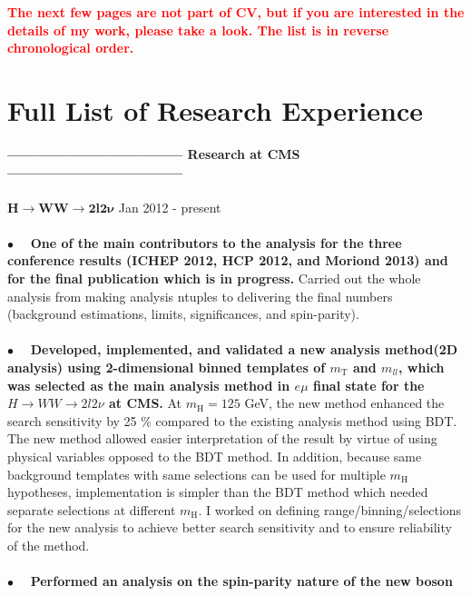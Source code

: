 \documentclass[margin]{res}
\begin{document}
\begin{resume}
\newpage
\textbf{ \textcolor{red}{ 
The next few pages are not part of CV, but if you are interested in the details of my work,
please take a look. The list is in reverse chronological order.}}

\newpage
\section{Full List of Research Experience}
\textbf{------------------------------------ 
                Research at CMS 
        ------------------------------------} 
\\
\\
\textbf{$\mathbf{H\rightarrow WW \rightarrow 2l2\nu}$} 
        \hfill Jan 2012 - present 
    \\   
    \\
      $\bullet\quad$  \textbf{One of the main contributors to the analysis for the three conference results
      (ICHEP 2012, HCP 2012, and Moriond 2013) and for the final publication which is in progress.} 
      Carried out the whole analysis from making analysis ntuples to delivering  the 
      final numbers (background estimations, limits, significances, and spin-parity).
    \\
    \\
      $\bullet\quad$ \textbf{Developed, implemented, and validated a new analysis method(2D analysis) 
      using 2-dimensional binned templates of $m_{\mathrm{T}}$ and $m_{ll}$, which was selected 
      as the main analysis method in $e\mu$ final state for the $H\rightarrow WW \rightarrow 2l2\nu$ at CMS.}
      At $m_{\mathrm{H}}=125$ GeV,
      the new method enhanced the search sensitivity by 25 \% compared to the existing 
      analysis method using BDT. The new method allowed easier interpretation of the result 
      by virtue of using physical variables opposed to the BDT method. 
      In addition, because same background templates with same selections can be used 
      for multiple $m_{\mathrm{H}}$ hypotheses, implementation is simpler 
      than the BDT method which needed separate selections at different $m_{\mathrm{H}}$. 
      I worked on defining range/binning/selections for the new 
      analysis to achieve better search sensitivity and to ensure reliability of the method. 
    \\
    \\
    $\bullet\quad$  \textbf{Performed an analysis on the spin-parity nature of the new boson} 

\end{resume}
\end{document}
